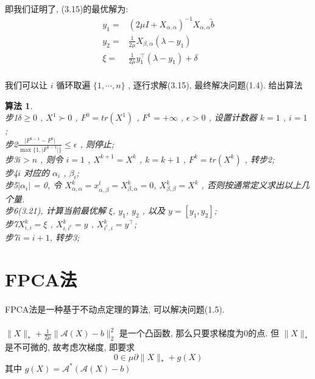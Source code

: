 \documentclass[UTF8]{ctexart}
\newtheorem{algo}{算法}
\newcommand{\s}{\quad}
\newcommand{\sect}{\section}
\newcommand{\equSplit}[1]{\begin{equation}\begin{split}#1\end{split}\end{equation}}
\newcommand{\abs}[1]{\lvert#1\rvert}
\newcommand{\norm}[1]{\lVert#1\rVert}
\newcommand{\nunorm}{\norm{X}_*}
\numberwithin{equation}{section}
\begin{document}
			
		\paragraph{}\quad 即我们证明了, (3.15)的最优解为:
			\equSplit{
				y_1 = & (2 \mu I + X_{\alpha, \alpha})^{-1} X_{\alpha, \alpha}\tilde{b}\\
				y_2 = & \frac{1}{2 \mu} X_{\beta, \alpha} (\lambda - y_1)\\
				\xi = & \frac{1}{2 \mu} y_1^\top (\lambda - y_1) + \delta
			}

		\paragraph{}\quad 我们可以让 $i$ 循环取遍 $\{1, \cdots, n\}$ , 逐行求解(3.15), 最终解决问题(1.4). 给出算法
			\begin{algo}
				\s\\
				步1 $\delta \ge 0$ , $X^1 \succ 0$ , $F^0 = tr(X^1)$ , $F^1=+\infty$ , $\epsilon>0$ , 设置计数器 $k=1$ , $i=1$ ;\\
				步2 $\frac{\abs{F^{k-1}-F^k}}{\max\{1,\abs{F^{k-1}}\}}\leq\epsilon$ , 则停止;\\
				步3 $i>n$ , 则令 $i=1$ , $X^{k+1}=X^k$ , $k=k+1$ , $F^k = tr(X^k)$ , 转步2;\\
				步4 $i$ 对应的 $\alpha_i$ , $\beta_i$;\\
				步5 $\vert{\alpha_i}\vert$ = 0, 令 $X^k_{\alpha, \alpha} = x^l_{\alpha, \beta} = X^k_{\beta, \alpha} = 0$, $X^k_{\beta, \beta} = X^k$ , 否则按通常定义求出以上几个量.\\
				步6(3.21), 计算当前最优解 $\xi$, $y_1$, $y_2$ , 以及 $y = [y_1, y_2]$;\\
				步7 $X^{k}_{i, i}=\xi$ , $X^{k}_{i,i^c} = y$ , $X^{k}_{i^c,i}=y^\top$;\\
				步7\s$i=i+1$, 转步3;
			\end{algo}


	\sect{FPCA法}
		\paragraph{}
			\quad FPCA法是一种基于不动点定理的算法, 可以解决问题(1.5). 

		\paragraph{}
			\quad $\nunorm+\frac{1}{2\mu}\norm{\mathcal{A}(X)-b}_2^2$ 是一个凸函数, 那么只要求梯度为0的点. 但 $\nunorm$ 是不可微的, 故考虑次梯度, 即要求
				\begin{equation}
					0 \in \mu \partial \nunorm + g(X)
				\end{equation}
			其中 $g(X) = \mathcal{A}^*(\mathcal{A}(X) - b)$
		
\end{document}
